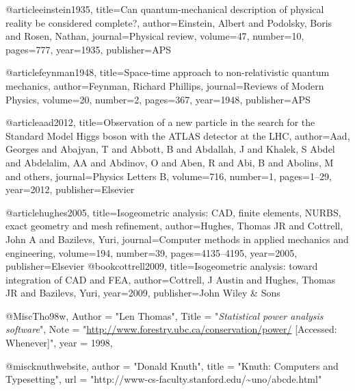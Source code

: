  
@article{einstein1935,
  title={Can quantum-mechanical description of physical reality be considered complete?},
  author={Einstein, Albert and Podolsky, Boris and Rosen, Nathan},
  journal={Physical review},
  volume={47},
  number={10},
  pages={777},
  year={1935},
  publisher={APS}
}

@article{feynman1948,
  title={Space-time approach to non-relativistic quantum mechanics},
  author={Feynman, Richard Phillips},
  journal={Reviews of Modern Physics},
  volume={20},
  number={2},
  pages={367},
  year={1948},
  publisher={APS}
}

@article{aad2012,
  title={Observation of a new particle in the search for the Standard Model Higgs boson with the ATLAS detector at the LHC},
  author={Aad, Georges and Abajyan, T and Abbott, B and Abdallah, J and Khalek, S Abdel and Abdelalim, AA and Abdinov, O and Aben, R and Abi, B and Abolins, M and others},
  journal={Physics Letters B},
  volume={716},
  number={1},
  pages={1--29},
  year={2012},
  publisher={Elsevier}
}

@article{hughes2005,
  title={Isogeometric analysis: CAD, finite elements, NURBS, exact geometry and mesh refinement},
  author={Hughes, Thomas JR and Cottrell, John A and Bazilevs, Yuri},
  journal={Computer methods in applied mechanics and engineering},
  volume={194},
  number={39},
  pages={4135--4195},
  year={2005},
  publisher={Elsevier}
}
@book{cottrell2009,
  title={Isogeometric analysis: toward integration of CAD and FEA},
  author={Cottrell, J Austin and Hughes, Thomas JR and Bazilevs, Yuri},
  year={2009},
  publisher={John Wiley \& Sons}
}


@Misc{Tho98w,
  Author = "Len Thomas",
  Title  = "\emph{Statistical power analysis software}",
  Note   = "\url{http://www.forestry.ubc.ca/conservation/power/}
           [Accessed: Whenever]",
  year = 1998,
}


@misc{knuthwebsite,
    author    = "Donald Knuth",
    title     = "Knuth: Computers and Typesetting",
    url       = "http://www-cs-faculty.stanford.edu/\~{}uno/abcde.html"
}